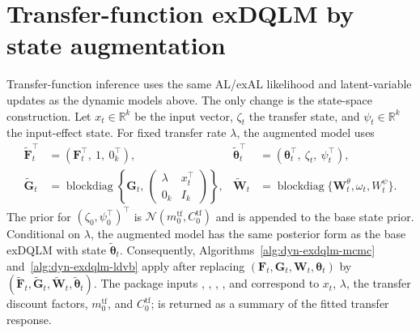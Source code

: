 \documentclass[nojss,noheadings]{jss}
\newcommand{\R}{\mathbb{R}}
\newcommand{\vect}[1]{\bm{#1}}
\newcommand{\mat}[1]{\mathbf{#1}}
\newcommand{\N}{\mathcal{N}}
\begin{document}
\section{Transfer-function exDQLM by state augmentation}
\label{sec:transfer_function}

Transfer-function inference uses the same AL/exAL likelihood and latent-variable
updates as the dynamic models above. The only change is the state-space
construction. Let $x_t\in\R^k$ be the input vector, $\zeta_t$ the transfer
state, and $\psi_t\in\R^k$ the input-effect state. For fixed transfer rate
$\lambda$, the augmented model uses
\begin{align}
\widetilde{\mat{F}}_t^\top
&=(\mat{F}_t^\top,\ 1,\ 0_k^\top),&
\widetilde{\vect{\theta}}_t^\top
&=(\vect{\theta}_t^\top,\ \zeta_t,\ \psi_t^\top),
\label{eq:tf_aug_state}\\
\widetilde{\mat{G}}_t
&=
\operatorname{blockdiag}\left\{
\mat{G}_t,\,
\begin{pmatrix}
\lambda & x_t^\top\\
0_k & I_k
\end{pmatrix}
\right\},&
\widetilde{\mat{W}}_t
&=\operatorname{blockdiag}\{\mat{W}_t^\theta,\omega_t,W_t^\psi\}.
\label{eq:tf_aug_mats}
\end{align}
The prior for $(\zeta_0,\psi_0^\top)^\top$ is
$\N(m_0^{\mathrm{tf}},C_0^{\mathrm{tf}})$ and is appended to the base
state prior. Conditional on $\lambda$, the augmented model has the same
posterior form as the base exDQLM with state
$\widetilde{\vect{\theta}}_t$. Consequently,
Algorithms~\ref{alg:dyn-exdqlm-mcmc} and~\ref{alg:dyn-exdqlm-ldvb} apply after replacing
$(\mat{F}_t,\mat{G}_t,\mat{W}_t,\vect{\theta}_t)$ by
$(\widetilde{\mat{F}}_t,\widetilde{\mat{G}}_t,\widetilde{\mat{W}}_t,
\widetilde{\vect{\theta}}_t)$.
The package inputs , , , , and
 correspond to $x_t$, $\lambda$, the transfer discount factors,
$m_0^{\mathrm{tf}}$, and $C_0^{\mathrm{tf}}$;  is returned as a
summary of the fitted transfer response.
\end{document}
